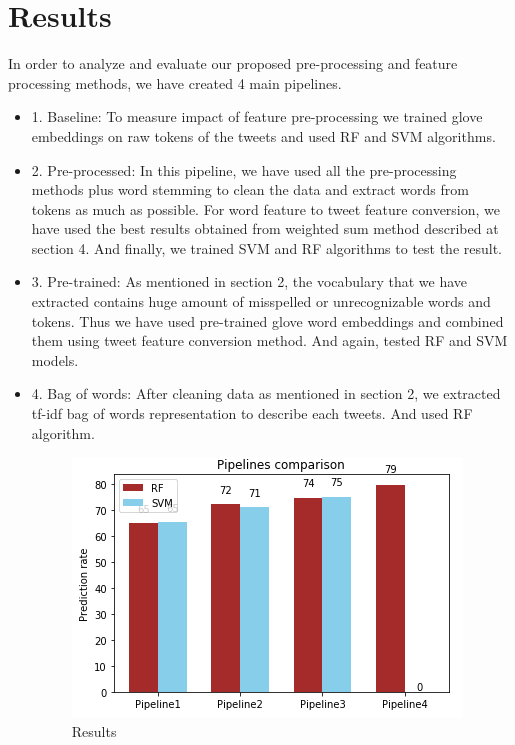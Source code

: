 \documentclass[10pt,conference,compsocconf]{IEEEtran}
\begin{document}
\section{Results}
\label{S4}
In order to analyze and evaluate our proposed pre-processing and feature processing methods, we have created 4 main pipelines.
\begin{itemize}
	\item 1. Baseline: 
	To measure impact of feature pre-processing we trained glove embeddings on raw tokens of the tweets and used RF and SVM algorithms.
	\item 2. Pre-processed:
	In this pipeline, we have used all the pre-processing methods plus word stemming to clean the data and extract words from tokens as much as possible. For word feature to tweet feature conversion, we have used the best results obtained from weighted sum method described at section 4. And finally, we trained SVM and RF algorithms to test the result.
	\item 3. Pre-trained:
	As mentioned in section 2, the vocabulary that we have extracted contains huge amount of misspelled or unrecognizable words and tokens. Thus we have used pre-trained glove word embeddings and combined them using tweet feature conversion method. And again, tested RF and SVM models.
	\item 4. Bag of words:
	After cleaning data as mentioned in section 2, we extracted tf-idf bag of words representation to describe each tweets. And used RF algorithm.
	
\begin{tiny}
	\begin{figure}[b] \label{fig5}
		\includegraphics[scale=0.8]{results.png}   
		\caption{Results }
		\label{fig5}    
	\end{figure}
\end{tiny}


\end{itemize}
\end{document}
